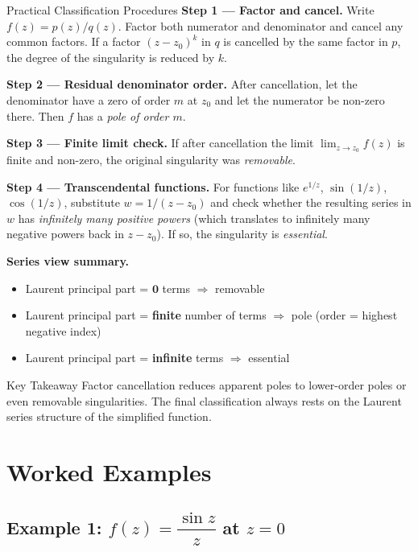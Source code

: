 \documentclass[12pt,a4paper]{article}
\begin{document}
\begin{infobox}{Practical Classification Procedures}
\textbf{Step 1 --- Factor and cancel.}
Write $f(z) = p(z)/q(z)$. Factor both numerator and denominator and cancel any common factors.
If a factor $(z - z_0)^k$ in $q$ is cancelled by the same factor in $p$, the degree of the
singularity is reduced by $k$.

\textbf{Step 2 --- Residual denominator order.}
After cancellation, let the denominator have a zero of order $m$ at $z_0$ and let the numerator
be non-zero there. Then $f$ has a \emph{pole of order $m$}.

\textbf{Step 3 --- Finite limit check.}
If after cancellation the limit $\lim_{z\to z_0}f(z)$ is finite and non-zero, the original
singularity was \emph{removable}.

\textbf{Step 4 --- Transcendental functions.}
For functions like $e^{1/z}$, $\sin(1/z)$, $\cos(1/z)$, substitute $w = 1/(z-z_0)$ and check
whether the resulting series in $w$ has \emph{infinitely many positive powers} (which translates
to infinitely many negative powers back in $z - z_0$). If so, the singularity is \emph{essential}.

\textbf{Series view summary.}
\begin{itemize}[leftmargin=2em]
  \item Laurent principal part = $\mathbf{0}$ terms $\Rightarrow$ removable
  \item Laurent principal part = \textbf{finite} number of terms $\Rightarrow$ pole (order = highest negative index)
  \item Laurent principal part = \textbf{infinite} terms $\Rightarrow$ essential
\end{itemize}
\end{infobox}

\begin{learnbox}{Key Takeaway}
Factor cancellation reduces apparent poles to lower-order poles or even removable singularities.
The final classification always rests on the Laurent series structure of the simplified function.
\end{learnbox}

\section{Worked Examples}

\subsection*{Example 1: $f(z) = \dfrac{\sin z}{z}$ at $z = 0$}
\end{document}
